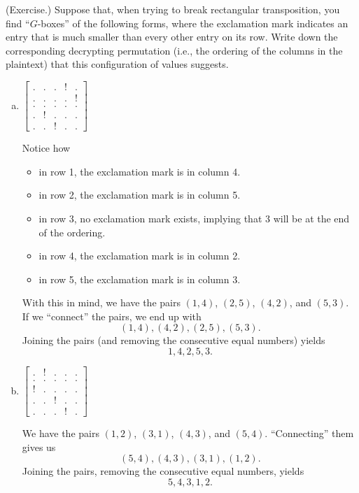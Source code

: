 \documentclass[letterpaper]{article}
\newcommand{\0}{\mathbf{0}}
\begin{document}
\begin{mdframed}
    (Exercise.) Suppose that, when trying to break rectangular transposition, you find ``$G$-boxes'' of the following forms, where the exclamation mark indicates an entry that is much smaller than every other entry on its row. Write down the corresponding decrypting permutation (i.e., the ordering of the columns in the plaintext) that this configuration of values suggests.

    \begin{enumerate}[(a)]
        \item $\begin{bmatrix}
            . & . & . & ! & . \\ 
            . & . & . & . & ! \\ 
            . & . & . & . & . \\ 
            . & ! & . & . & . \\ 
            . & . & ! & . & .
        \end{bmatrix}$
        \begin{mdframed}
            Notice how 
            \begin{itemize}
                \item in row 1, the exclamation mark is in column 4.
                \item in row 2, the exclamation mark is in column 5. 
                \item in row 3, no exclamation mark exists, implying that 3 will be at the end of the ordering. 
                \item in row 4, the exclamation mark is in column 2. 
                \item in row 5, the exclamation mark is in column 3. 
            \end{itemize}
            With this in mind, we have the pairs $(1, 4)$, $(2, 5)$, $(4, 2)$, and $(5, 3)$. If we ``connect'' the pairs, we end up with 
            \[(1, 4), (4, 2), (2, 5), (5, 3).\]
            Joining the pairs (and removing the consecutive equal numbers) yields 
            \[1, 4, 2, 5, 3.\]
        \end{mdframed}

        \item $\begin{bmatrix}
            . & ! & . & . & . \\ 
            . & . & . & . & . \\ 
            ! & . & . & . & . \\ 
            . & . & ! & . & . \\ 
            . & . & . & ! & . 
        \end{bmatrix}$
        \begin{mdframed}
            We have the pairs $(1, 2)$, $(3, 1)$, $(4, 3)$, and $(5, 4)$. ``Connecting'' them gives us 
            \[(5, 4), (4, 3), (3, 1), (1, 2).\]
            Joining the pairs, removing the consecutive equal numbers, yields 
            \[5, 4, 3, 1, 2.\]
        \end{mdframed}


\end{enumerate}
\end{mdframed}
\end{document}
